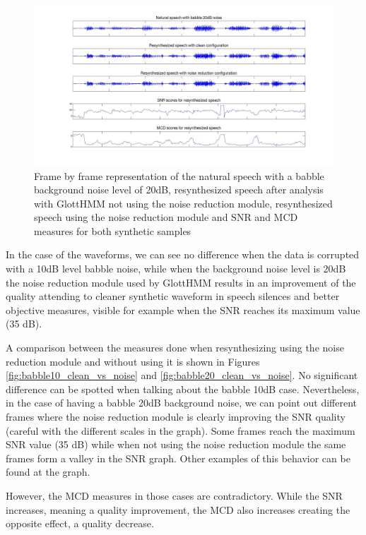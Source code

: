 \begin{figure}[!htb]
\begin{adjustwidth}{-2.6cm}{}
\includegraphics[width=1.3\textwidth]{images/babble20_frame_by_frame.jpg}
\end{adjustwidth}
\caption{Frame by frame representation of the natural speech with a babble background noise level of 20dB, resynthesized speech after analysis with GlottHMM not using the noise reduction module, resynthesized speech using the noise reduction module and SNR and MCD measures for both synthetic samples}
\label{fig:frame_by_frame_babble20}
\end{figure}

In the case of the waveforms, we can see no difference when the data is corrupted with a 10dB level babble noise, while when the background noise level is 20dB the noise reduction module used by GlottHMM results in an improvement of the quality attending to cleaner synthetic waveform in speech silences and better objective measures, visible for example when the SNR reaches its maximum value (35 dB). 

A comparison between the measures done when resynthesizing using the noise reduction module and without using it is shown in Figures \ref{fig:babble10_clean_vs_noise} and \ref{fig:babble20_clean_vs_noise}. 
%
No significant difference can be spotted when talking about the babble 10dB case.
%
Nevertheless, in the case of having a babble 20dB background noise, we can point out different frames where the noise reduction module is clearly improving the SNR quality (careful with the different scales in the graph).
%
Some frames reach the maximum SNR value (35 dB) while when not using the noise reduction module the same frames form a valley in the SNR graph.
%
Other examples of this behavior can be found at the graph.

However, the MCD measures in those cases are contradictory. 
%
While the SNR increases, meaning a quality improvement, the MCD also increases creating the opposite effect, a quality decrease.

